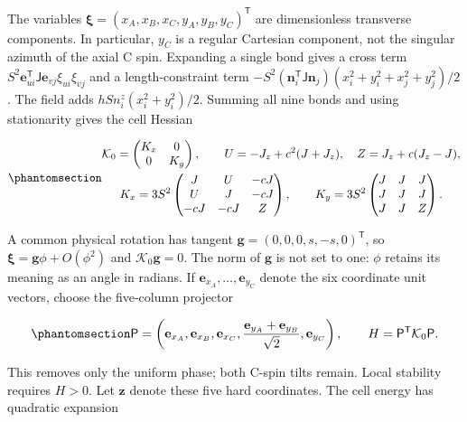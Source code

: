 The variables \(\boldsymbol\xi=(x_A,x_B,x_C,y_A,y_B,y_C)^{\mathsf T}\)
are dimensionless transverse components. In particular, \(y_C\) is a
regular Cartesian component, not the singular azimuth of the axial C
spin. Expanding a single bond gives a cross term
\(S^2\mathbf e_{u i}^{\mathsf T}\mathsf J\mathbf e_{v j}\xi_{u i}\xi_{v j}\)
and a length-constraint term
\(-S^2(\mathbf n_i^{\mathsf T}\mathsf J\mathbf n_j)(x_i^2+y_i^2+x_j^2+y_j^2)/2\).
The field adds \(hS n_i^z(x_i^2+y_i^2)/2\). Summing all nine bonds and
using stationarity gives the cell Hessian

\begin{equation}\phantomsection\label{eq-nbcp-y-uniform-hessian}{
\begin{gathered}
\mathcal K_0=\begin{pmatrix}K_x&0\\0&K_y\end{pmatrix},\qquad
U=-J_z+c^2(J+J_z),\quad Z=J_z+c(J_z-J),\\
K_x=3S^2\begin{pmatrix}J&U&-cJ\\U&J&-cJ\\-cJ&-cJ&Z\end{pmatrix},\qquad
K_y=3S^2\begin{pmatrix}J&J&J\\J&J&J\\J&J&Z\end{pmatrix}.
\end{gathered}
}\end{equation}

A common physical rotation has tangent
\(\mathbf g=(0,0,0,s,-s,0)^{\mathsf T}\), so
\(\boldsymbol\xi=\mathbf g\phi+O(\phi^2)\) and
\(\mathcal K_0\mathbf g=0\). The norm of \(\mathbf g\) is not set to
one: \(\phi\) retains its meaning as an angle in radians. If
\(\mathbf e_{x_A},\ldots,\mathbf e_{y_C}\) denote the six coordinate
unit vectors, choose the five-column projector

\begin{equation}\phantomsection\label{eq-nbcp-y-hard-projector}{
\mathsf P=\left(\mathbf e_{x_A},\mathbf e_{x_B},\mathbf e_{x_C},
\frac{\mathbf e_{y_A}+\mathbf e_{y_B}}{\sqrt2},\mathbf e_{y_C}\right),
\qquad H=\mathsf P^{\mathsf T}\mathcal K_0\mathsf P.
}\end{equation}

This removes only the uniform phase; both C-spin tilts remain. Local
stability requires \(H>0\). Let \(\mathbf z\) denote these five hard
coordinates. The cell energy has quadratic expansion

